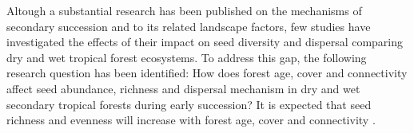 






Altough a substantial research has been published on the mechanisms of secondary succession and to its related landscape factors, few studies have investigated the effects of their impact on seed diversity and dispersal comparing dry and wet tropical forest ecosystems. To address this gap, the following research question has been identified: How does forest age, cover and connectivity affect seed abundance, richness and dispersal mechanism in dry and wet secondary tropical forests during early succession? It is expected that seed richness and evenness will increase with forest age, cover and connectivity \citep{chazdonSecondGrowthPromise2014}.
